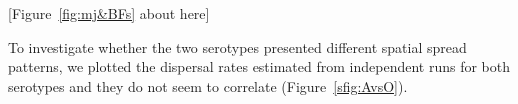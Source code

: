 \documentclass[10pt]{article}
\begin{document}
\begin{center}
 [Figure~\ref{fig:mj&BFs} about here]
\end{center}

To investigate whether the two serotypes presented different spatial spread patterns, we plotted the dispersal rates estimated from independent runs for both serotypes and they do not seem to correlate (Figure~\ref{sfig:AvsO}).


\end{document}
